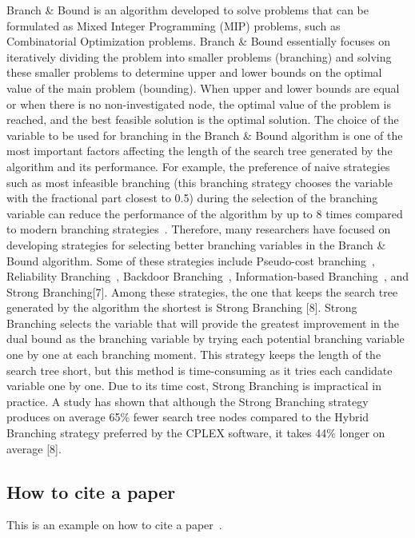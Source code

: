 Branch \& Bound is an algorithm developed to solve problems that can be formulated as Mixed Integer Programming (MIP) problems, such as Combinatorial Optimization problems.
Branch \& Bound essentially focuses on iteratively dividing the problem into smaller problems (branching) and solving these smaller problems to determine upper and lower bounds on the optimal value of the main problem (bounding).
When upper and lower bounds are equal or when there is no non-investigated node, the optimal value of the problem is reached, and the best feasible solution is the optimal solution.
The choice of the variable to be used for branching in the Branch \& Bound algorithm is one of the most important factors affecting the length of the search tree generated by the algorithm and its performance.
For example, the preference of naive strategies such as most infeasible branching (this branching strategy chooses the variable with the fractional part closest to 0.5) during the selection of the branching variable can reduce the performance of the algorithm by up to 8 times compared to modern branching strategies~\cite{achterberg_mixed_2013}.
Therefore, many researchers have focused on developing strategies for selecting better branching variables in the Branch \& Bound algorithm.
Some of these strategies include Pseudo-cost branching~\cite{benichou_experiments_1971}, Reliability Branching~\cite{achterbergBranchingRulesRevisited2005}, Backdoor Branching~\cite{fischettiBackdoorBranching2011}, Information-based Branching~\cite{kilinckarzanInformationbasedBranchingSchemes2009}, and Strong Branching[7].
Among these strategies, the one that keeps the search tree generated by the algorithm the shortest is Strong Branching [8].
Strong Branching selects the variable that will provide the greatest improvement in the dual bound as the branching variable by trying each potential branching variable one by one at each branching moment.
This strategy keeps the length of the search tree short, but this method is time-consuming as it tries each candidate variable one by one.
Due to its time cost, Strong Branching is impractical in practice.
A study has shown that although the Strong Branching strategy produces on average 65\% fewer search tree nodes compared to the Hybrid Branching strategy preferred by the CPLEX software, it takes 44\% longer on average [8].

\subsection{How to cite a paper}\label{subsec:how-to-cite-a-paper}
This is an example on how to cite a paper~\cite{Tartarini2020a}.

